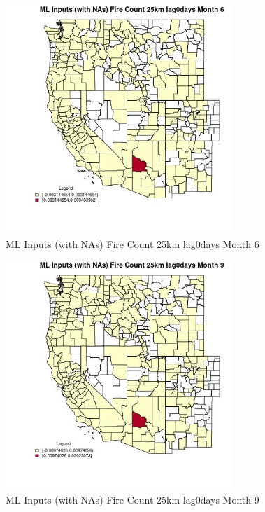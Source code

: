 \begin{figure} 
\centering  
\includegraphics[width=0.77\textwidth]{Code_Outputs/Report_ML_input_PM25_Step4_part_e_de_duplicated_aves_compiled_2019-05-20wNAs_CountyFire_Count_25km_lag0daysmedianMonth6.jpg} 
\caption{\label{fig:Report_ML_input_PM25_Step4_part_e_de_duplicated_aves_compiled_2019-05-20wNAsCountyFire_Count_25km_lag0daysmedianMonth6}ML Inputs (with NAs) Fire Count 25km lag0days Month 6} 
\end{figure} 
 

\begin{figure} 
\centering  
\includegraphics[width=0.77\textwidth]{Code_Outputs/Report_ML_input_PM25_Step4_part_e_de_duplicated_aves_compiled_2019-05-20wNAs_CountyFire_Count_25km_lag0daysmedianMonth9.jpg} 
\caption{\label{fig:Report_ML_input_PM25_Step4_part_e_de_duplicated_aves_compiled_2019-05-20wNAsCountyFire_Count_25km_lag0daysmedianMonth9}ML Inputs (with NAs) Fire Count 25km lag0days Month 9} 
\end{figure} 
 

